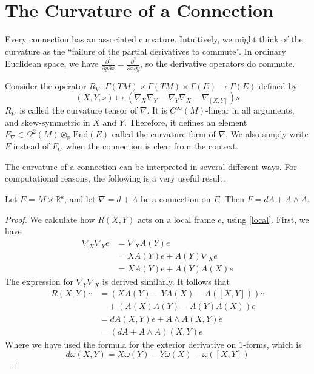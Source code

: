 \section{The Curvature of a Connection}

Every connection has an associated curvature. Intuitively, we might think of the curvature as the ``failure of the partial derivatives to commute''. In ordinary Euclidean space, we have $\frac{\partial^2}{\partial y\partial x}=\frac{\partial^2}{\partial x\partial y}$, so the derivative operators do commute.
\begin{definition}
  Consider the operator $R_\nabla:\Gamma(TM)\times\Gamma(TM)\times\Gamma(E)\to\Gamma(E)$ defined by
  $$(X,Y,s)\mapsto(\nabla_X\nabla_Y-\nabla_Y\nabla_X-\nabla_{[X,Y]})s$$
  $R_\nabla$ is called the curvature tensor of $\nabla$. It is $C^\infty(M)$-linear in all arguments, and skew-symmetric in $X$ and $Y$. Therefore, it defines an element $F_\nabla\in\Omega^2(M)\otimes_\mathbb{R}\text{End}(E)$ called the curvature form of $\nabla$. We also simply write $F$ instead of $F_\nabla$ when the connection is clear from the context.
\end{definition}
The curvature of a connection can be interpreted in several different ways. For computational reasons, the following is a very useful result.
\begin{theorem}\label{cartan}
  Let $E=M\times\mathbb{R}^k$, and let $\nabla=d+A$ be a connection on $E$. Then $F=dA+A\wedge A$.
\end{theorem}
\begin{proof}
  We calculate how $R(X,Y)$ acts on a local frame $e$, using \ref{local}. First, we have
  \begin{align*}
    \nabla_X\nabla_Ye &=\nabla_XA(Y)e \\
                      &=XA(Y)e+A(Y)\nabla_Xe \\
                      &=XA(Y)e+A(Y)A(X)e
  \end{align*}
  The expression for $\nabla_Y\nabla_X$ is derived similarly. It follows that
  \begin{align*}
    R(X,Y)e &= (XA(Y)-YA(X)-A([X,Y]))e \\
            &\quad +(A(X)A(Y)-A(Y)A(X))e\\ 
            &= dA(X,Y)e+A\wedge A(X,Y)e \\
            &= (dA+A\wedge A)(X,Y)e
  \end{align*}
  Where we have used the formula for the exterior derivative on $1$-forms, which is $$d\omega(X,Y)=X\omega(Y)-Y\omega(X)-\omega([X,Y])$$
\end{proof}
